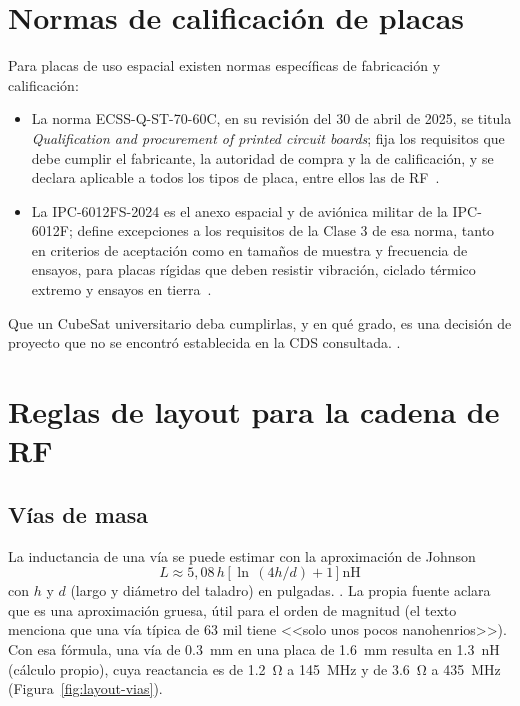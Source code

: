 \section{Normas de calificación de placas}\label{sec:layout-normas}

Para placas de uso espacial existen normas específicas de fabricación y calificación:

\begin{itemize}
  \item La norma ECSS-Q-ST-70\nobreakdash-60C, en su revisión del 30 de abril de 2025, se titula \emph{Qualification and procurement of printed circuit boards}; fija los requisitos que debe cumplir el fabricante, la autoridad de compra y la de calificación, y se declara aplicable a todos los tipos de placa, entre ellos las de RF~\cite{ecss7060}.
  \item La IPC-6012FS-2024 es el anexo espacial y de aviónica militar de la IPC-6012F; define excepciones a los requisitos de la Clase 3 de esa norma, tanto en criterios de aceptación como en tamaños de muestra y frecuencia de ensayos, para placas rígidas que deben resistir vibración, ciclado térmico extremo y ensayos en tierra~\cite{ipc6012fs}.
\end{itemize}

Que un CubeSat universitario deba cumplirlas, y en qué grado, es una decisión de proyecto que no se encontró establecida en la CDS consultada. .

\section{Reglas de layout para la cadena de RF}\label{sec:layout-reglas}

\subsection{Vías de masa}\label{sec:layout-vias}

La inductancia de una vía se puede estimar con la aproximación de Johnson~\cite{johnsonvia,johnsongraham}
\begin{equation}\label{eq:layout-via}
  L \approx 5{,}08\,h\,\bigl[\,\ln\,(4h/d) + 1\,\bigr]\ \si{\nano\henry}
\end{equation}
con $h$ y $d$ (largo y diámetro del taladro) en pulgadas. . La propia fuente aclara que es una aproximación gruesa, útil para el orden de magnitud (el texto menciona que una vía típica de 63 mil tiene <<solo unos pocos nanohenrios>>). Con esa fórmula, una vía de \SI{0,3}{\milli\metre} en una placa de \SI{1,6}{\milli\metre} resulta en \SI{1,3}{\nano\henry} (cálculo propio), cuya reactancia es de \SI{1,2}{\ohm} a \SI{145}{\mega\hertz} y de \SI{3,6}{\ohm} a \SI{435}{\mega\hertz} (Figura~\ref{fig:layout-vias}).


